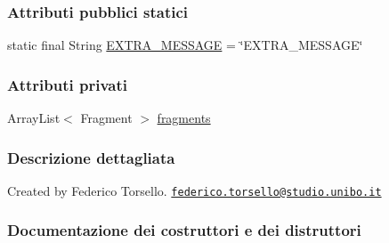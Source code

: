 \subsubsection*{Attributi pubblici statici}
\begin{DoxyCompactItemize}
\item 
static final String \hyperlink{classit_1_1unibo_1_1torsello_1_1bluetoothpositioning_1_1adapter_1_1StatePagerAdapter_ac9b774a91ff682b603f6f2ef409c4bf2_ac9b774a91ff682b603f6f2ef409c4bf2}{E\+X\+T\+R\+A\+\_\+\+M\+E\+S\+S\+A\+GE} = \char`\"{}E\+X\+T\+R\+A\+\_\+\+M\+E\+S\+S\+A\+GE\char`\"{}
\end{DoxyCompactItemize}
\subsubsection*{Attributi privati}
\begin{DoxyCompactItemize}
\item 
Array\+List$<$ Fragment $>$ \hyperlink{classit_1_1unibo_1_1torsello_1_1bluetoothpositioning_1_1adapter_1_1StatePagerAdapter_a6d30ff8266b65b268d46d03eb30da1db_a6d30ff8266b65b268d46d03eb30da1db}{fragments}
\end{DoxyCompactItemize}


\subsubsection{Descrizione dettagliata}
Created by Federico Torsello. \href{mailto:federico.torsello@studio.unibo.it}{\tt federico.\+torsello@studio.\+unibo.\+it} 

\subsubsection{Documentazione dei costruttori e dei distruttori}
\hypertarget{classit_1_1unibo_1_1torsello_1_1bluetoothpositioning_1_1adapter_1_1StatePagerAdapter_afd334cc5759e5d948cc53f04e3b595dc_afd334cc5759e5d948cc53f04e3b595dc}{}\label{classit_1_1unibo_1_1torsello_1_1bluetoothpositioning_1_1adapter_1_1StatePagerAdapter_afd334cc5759e5d948cc53f04e3b595dc_afd334cc5759e5d948cc53f04e3b595dc} 

